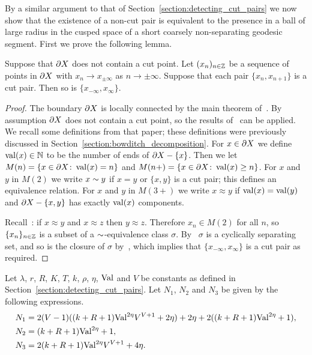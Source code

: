 By a similar argument to that of Section~\ref{section:detecting_cut_pairs} we now show that the existence of a non-cut pair is equivalent to the presence in a ball of large radius in the cusped space of a short coarsely non-separating geodesic segment.
First we prove the following lemma.

\begin{lemma}\label{lem:equivalenceclass} 
  Suppose that $\partial X$ does not contain a cut point. 
  Let $(x_n)_{n \in \mathbb{Z}}$ be a sequence of points in $\partial X$ with $x_n \to x_{\pm \infty}$ as $n\to \pm \infty$. 
  Suppose that each pair $\{x_n, x_{n+1}\}$ is a cut pair. 
  Then so is $\{x_{-\infty}, x_\infty\}$.  
\end{lemma}

\begin{proof} 
  The boundary $\partial X$ is locally connected by the main theorem of~\cite{bowditch99b}. 
  By assumption $\partial X$ does not contain a cut point, so the results of~\cite[Sections 2 and 3]{bowditch98} can be applied. 
  We recall some definitions from that paper; these definitions were previously discussed in Section~\ref{section:bowditch_decomposition}.
  For $x \in \partial X$ we define $\operatorname{\mathrm{val}}(x) \in \mathbb{N}$ to be the number of ends of $\partial X - \{x\}$. 
  Then we let $M(n) = \{x \in \partial X \colon \operatorname{\mathrm{val}}(x) = n\}$ and $M(n{+}) = \{x \in \partial X \colon \operatorname{\mathrm{val}}(x) \geq n\}$. 
  For $x$ and $y$ in $M(2)$ we write $x \sim y$ if $x = y$ or $\{x, y\}$ is a cut pair; this defines an equivalence relation. 
  For $x$ and $y$ in $M(3{+})$ we write $x \approx y$ if $\operatorname{\mathrm{val}}(x) = \operatorname{\mathrm{val}}(y)$ and $\partial X - \{x, y\}$ has exactly $\operatorname{\mathrm{val}}(x)$ components.

  Recall~\cite[Lemma 3.8]{bowditch98}: if $x \approx y$ and $x \approx z$ then $y \approx z$. 
  Therefore $x_n \in M(2)$ for all $n$, so $\{x_n\}_{n \in \mathbb{Z}}$ is a subset of a $\sim$-equivalence class $\sigma$. 
  By~\cite[Lemma 3.2]{bowditch98} $\sigma$ is a cyclically separating set, and so is the closure of $\sigma$ by~\cite[Lem.\ 2.2]{bowditch98}, which implies that $\{x_{-\infty}, x_\infty\}$ is a cut pair as required.
\end{proof}

Let $\lambda$, $r$, $R$, $K$, $T$, $k$, $\rho$, $\eta$, $\mathrm{Val}$ and $V$ be constants as defined in Section~\ref{section:detecting_cut_pairs}. 
Let $N_1$, $N_2$ and $N_3$ be given by the following expressions.
\begin{align} 
  N_1 &= 2(V-1)((k+R+1)\mathrm{Val}^{2\eta}V^{V+1} + 2\eta) + 2\eta + 2((k+R+1)\mathrm{Val}^{2\eta} + 1),\\
  N_2 &= (k+R+1)\mathrm{Val}^{2\eta} + 1,\\
  N_3 &= 2(k + R + 1)\mathrm{Val}^{2\eta}V^{V+1} + 4\eta.
\end{align}

